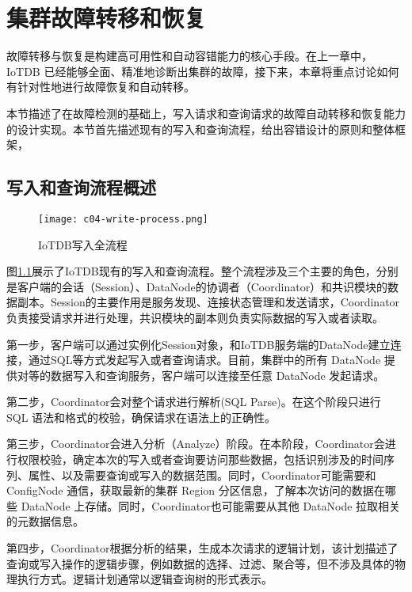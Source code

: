 
\chapter{集群故障转移和恢复}

故障转移与恢复是构建高可用性和自动容错能力的核心手段。在上一章中，IoTDB 已经能够全面、精准地诊断出集群的故障，接下来，本章将重点讨论如何有针对性地进行故障恢复和自动转移。

本节描述了在故障检测的基础上，写入请求和查询请求的故障自动转移和恢复能力的设计实现。本节首先描述现有的写入和查询流程，给出容错设计的原则和整体框架，

\section{写入和查询流程概述}

\begin{figure}
  \centering
  \texttt{[image: c04-write-process.png]}
  \caption{IoTDB写入全流程}
  \label{fig:c04-write-process}
\end{figure}

图\ref{fig:c04-write-process}展示了IoTDB现有的写入和查询流程。整个流程涉及三个主要的角色，分别是客户端的会话（Session）、DataNode的协调者（Coordinator）和共识模块的数据副本。Session的主要作用是服务发现、连接状态管理和发送请求，Coordinator负责接受请求并进行处理，共识模块的副本则负责实际数据的写入或者读取。

第一步，客户端可以通过实例化Session对象，和IoTDB服务端的DataNode建立连接，通过SQL等方式发起写入或者查询请求。目前，集群中的所有 DataNode 提供对等的数据写入和查询服务，客户端可以连接至任意 DataNode 发起请求。

第二步，Coordinator会对整个请求进行解析(SQL Parse)。在这个阶段只进行 SQL 语法和格式的校验，确保请求在语法上的正确性。

第三步，Coordinator会进入分析（Analyze）阶段。在本阶段，Coordinator会进行权限校验，确定本次的写入或者查询要访问那些数据，包括识别涉及的时间序列、属性、以及需要查询或写入的数据范围。同时，Coordinator可能需要和ConfigNode 通信，获取最新的集群 Region 分区信息，了解本次访问的数据在哪些 DataNode 上存储。同时，Coordinator也可能需要从其他 DataNode 拉取相关的元数据信息。

第四步，Coordinator根据分析的结果，生成本次请求的逻辑计划，该计划描述了查询或写入操作的逻辑步骤，例如数据的选择、过滤、聚合等，但不涉及具体的物理执行方式。逻辑计划通常以逻辑查询树的形式表示。

